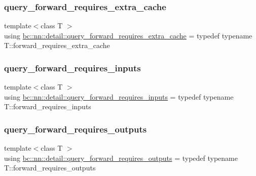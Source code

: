 \mbox{\label{namespacebc_1_1nn_1_1detail_a51767bf55cf9cdf8cdff0f2929304390}} 
\subsubsection{\texorpdfstring{query\+\_\+forward\+\_\+requires\+\_\+extra\+\_\+cache}{query\_forward\_requires\_extra\_cache}}
{\footnotesize\ttfamily template$<$class T $>$ \\
using \hyperlink{namespacebc_1_1nn_1_1detail_a51767bf55cf9cdf8cdff0f2929304390}{bc\+::nn\+::detail\+::query\+\_\+forward\+\_\+requires\+\_\+extra\+\_\+cache} = typedef typename T\+::forward\+\_\+requires\+\_\+extra\+\_\+cache}

\mbox{\label{namespacebc_1_1nn_1_1detail_a93de41b72dd88c58d8f1d74276da87b3}} 
\subsubsection{\texorpdfstring{query\+\_\+forward\+\_\+requires\+\_\+inputs}{query\_forward\_requires\_inputs}}
{\footnotesize\ttfamily template$<$class T $>$ \\
using \hyperlink{namespacebc_1_1nn_1_1detail_a93de41b72dd88c58d8f1d74276da87b3}{bc\+::nn\+::detail\+::query\+\_\+forward\+\_\+requires\+\_\+inputs} = typedef typename T\+::forward\+\_\+requires\+\_\+inputs}

\mbox{\label{namespacebc_1_1nn_1_1detail_a10314a67405b06863c6384de87e36bad}} 
\subsubsection{\texorpdfstring{query\+\_\+forward\+\_\+requires\+\_\+outputs}{query\_forward\_requires\_outputs}}
{\footnotesize\ttfamily template$<$class T $>$ \\
using \hyperlink{namespacebc_1_1nn_1_1detail_a10314a67405b06863c6384de87e36bad}{bc\+::nn\+::detail\+::query\+\_\+forward\+\_\+requires\+\_\+outputs} = typedef typename T\+::forward\+\_\+requires\+\_\+outputs}

